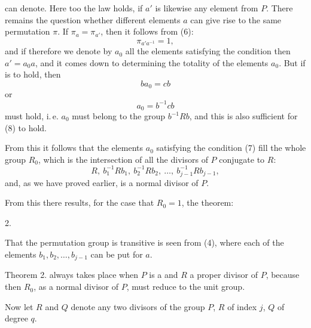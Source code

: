 can denote. Here too the law
holds, if $a'$ is likewise any element from $P$. There remains
the question whether different elements $a$ can give rise to the
same permutation $\pi$. If $\pi_a = \pi_{a'}$, then it follows from (6):
\[
\pi_{a'a^{-1}} = 1,
\]
and if therefore we denote by $a_0$ all the elements satisfying
the condition
then $a' = a_0 a$, and it comes down to determining the totality
of the elements $a_0$. But if
is to hold, then
\[
ba_0 = cb
\]
or
\[
a_0 = b^{-1}cb
\]
must hold, i.\,e. $a_0$ must belong to the group $b^{-1}Rb$, and this is
also sufficient for (8) to hold.

From this it follows that the elements $a_0$ satisfying the
condition (7) fill the whole group $R_0$, which is the intersection
of all the divisors of $P$ conjugate to $R$:
\[
R,\ b_1^{-1}Rb_1,\ b_2^{-1}Rb_2,\ \ldots,\ b_{j-1}^{-1}Rb_{j-1},
\]
and, as we have proved earlier, is a normal divisor
of $P$.

From this there results, for the case that $R_0 = 1$, the theorem:

2.\ 

That the permutation group is transitive is seen from (4),
where each of the elements $b_1, b_2, \ldots, b_{j-1}$ can be put for $a$.

Theorem 2. always takes place when $P$ is a 
and $R$ a proper divisor of $P$, because then $R_0$, as a normal divisor of $P$, must reduce to the unit group\footnotemark.

Now let $R$ and $Q$ denote any two divisors of the group $P$,
$R$ of index $j$, $Q$ of degree $q$.
